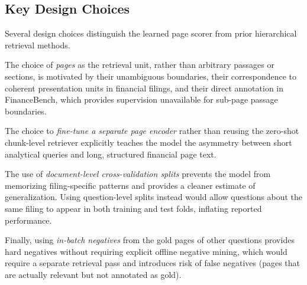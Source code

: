 \documentclass[12pt,twoside,maitrise]{dms}
\newcounter{example}
\theoremstyle{definition}
\numberwithin{equation}{section}
\numberwithin{table}{chapter}
\numberwithin{figure}{chapter}
\begin{document}


\subsection{Key Design Choices}

Several design choices distinguish the learned page scorer from prior hierarchical
retrieval methods.

The choice of \emph{pages} as the retrieval unit, rather than arbitrary passages or
sections, is motivated by their unambiguous boundaries, their correspondence to coherent
presentation units in financial filings, and their direct annotation in FinanceBench,
which provides supervision unavailable for sub-page passage boundaries.

The choice to \emph{fine-tune a separate page encoder} rather than reusing the zero-shot
chunk-level retriever explicitly teaches the model the asymmetry between short analytical
queries and long, structured financial page text.

The use of \emph{document-level cross-validation splits} prevents the model from
memorizing filing-specific patterns and provides a cleaner estimate of generalization.
Using question-level splits instead would allow questions about the same filing to appear
in both training and test folds, inflating reported performance.

Finally, using \emph{in-batch negatives} from the gold pages of other questions
provides hard negatives without requiring explicit offline negative mining, which would
require a separate retrieval pass and introduces risk of false negatives (pages that are
actually relevant but not annotated as gold).
\end{document}

